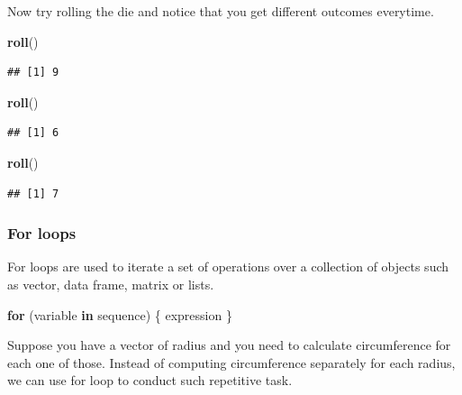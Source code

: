 \documentclass[
]{article}
\newenvironment{Shaded}{\begin{snugshade}}{\end{snugshade}}
\newcommand{\ControlFlowTok}[1]{\textcolor[rgb]{0.13,0.29,0.53}{\textbf{#1}}}
\newcommand{\FunctionTok}[1]{\textcolor[rgb]{0.13,0.29,0.53}{\textbf{#1}}}
\newcommand{\NormalTok}[1]{#1}
\begin{document}
Now try rolling the die and notice that you get different outcomes
everytime.

\begin{Shaded}
\begin{Highlighting}[]
\FunctionTok{roll}\NormalTok{()}
\end{Highlighting}
\end{Shaded}

\begin{verbatim}
## [1] 9
\end{verbatim}

\begin{Shaded}
\begin{Highlighting}[]
\FunctionTok{roll}\NormalTok{()}
\end{Highlighting}
\end{Shaded}

\begin{verbatim}
## [1] 6
\end{verbatim}

\begin{Shaded}
\begin{Highlighting}[]
\FunctionTok{roll}\NormalTok{()}
\end{Highlighting}
\end{Shaded}

\begin{verbatim}
## [1] 7
\end{verbatim}

\subsubsection{For loops}\label{for-loops}

For loops are used to iterate a set of operations over a collection of
objects such as vector, data frame, matrix or lists.

\begin{Shaded}
\begin{Highlighting}[]
\ControlFlowTok{for}\NormalTok{ (variable }\ControlFlowTok{in}\NormalTok{ sequence) \{}
\NormalTok{    expression}
\NormalTok{\}}
\end{Highlighting}
\end{Shaded}

Suppose you have a vector of radius and you need to calculate
circumference for each one of those. Instead of computing circumference
separately for each radius, we can use for loop to conduct such
repetitive task.
\end{document}
